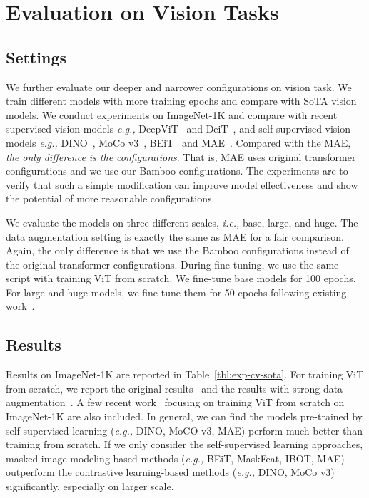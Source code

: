 \documentclass{article}
\theoremstyle{plain}
\theoremstyle{definition}
\theoremstyle{remark}
\newcommand{\ie}{\emph{i.e.,}\xspace}
\newcommand{\eg}{\emph{e.g.,}\xspace}
\begin{document}
\section{Evaluation on Vision Tasks}\label{Evaluation Vision}



\subsection{Settings} 

We further evaluate our deeper and narrower configurations on vision task. We train different models with more training epochs and compare with SoTA vision models. We conduct experiments on ImageNet-1K and compare with recent supervised vision models \eg DeepViT~\citep{zhou2021deepvit} and DeiT~\citep{touvron2021training},  and self-supervised vision models \eg DINO~\citep{caron2021emerging}, MoCo v3~\citep{chen2021empirical}, BEiT~\citep{bao2021beit} and MAE~\citep{he2021masked}. Compared with the MAE, \textit{the only difference is the configurations}. That is, MAE uses original transformer configurations and we use our Bamboo configurations. The experiments are to verify that such a simple modification can improve model effectiveness and show the potential of more reasonable configurations. 

We evaluate the models on three different scales, \ie base, large, and huge. The data augmentation setting is exactly the same as MAE for a fair comparison. Again, the only difference is that we use the Bamboo configurations instead of the original transformer configurations. During fine-tuning, we use the same script with training ViT from scratch. We fine-tune base models for 100 epochs. For large and huge models, we fine-tune them for 50 epochs following existing work~\citep{bao2021beit, he2021masked}. 



\subsection{Results} 


Results on ImageNet-1K are reported in Table~\ref{tbl:exp-cv-sota}. For training ViT from scratch, we report the original results~\citep{dosovitskiy2020image} and the results with strong data augmentation~\citep{he2021masked}. A few recent work~\citep{zhou2021deepvit,touvron2021training} focusing on training ViT from scratch on ImageNet-1K are also included. In general, we can find the models pre-trained by self-supervised learning (\eg DINO, MoCO v3, MAE) perform much better than training from scratch. If we only consider the self-supervised learning approaches, masked image modeling-based methods (\eg BEiT, MaskFeat, IBOT, MAE) outperform the contrastive learning-based methods (\eg DINO, MoCo v3) significantly, especially on larger scale. 
\end{document}

